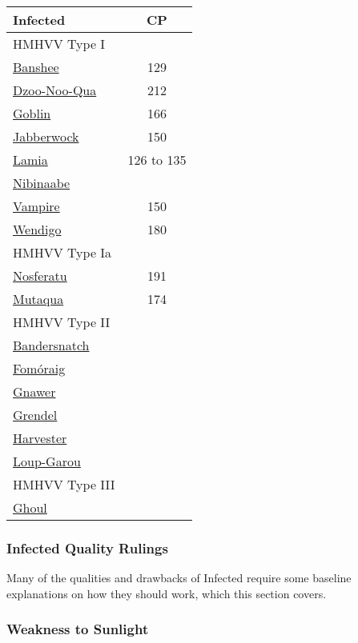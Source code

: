 \begin{multicols*}{3}
	
	\begin{center}
		\begin{tabularx}{0.32\textwidth}{|X|c|}
			\hline
			Infected & CP \\
			\hline
			\hline
			HMHVV Type I & \\
			\hline
			\hyperref[banshee]{Banshee} & 129 \\
			\hyperref[dzoo-noo-qua]{Dzoo-Noo-Qua} & 212 \\
			\hyperref[goblin]{Goblin} & 166 \\
			\hyperref[jabberwock]{Jabberwock} & 150 \\
			\hyperref[lamia]{Lamia} & 126 to 135 \\
			\hyperref[nibinaabe]{Nibinaabe} & \\
			\hyperref[vampire]{Vampire} & 150 \\
			\hyperref[wendigo]{Wendigo} & 180 \\
			\hline
			\hline
			HMHVV Type Ia & \\
			\hline
			\hyperref[nosferatu]{Nosferatu} & 191 \\
			\hyperref[mutaqua]{Mutaqua} & 174 \\
			\hline
			\hline
			HMHVV Type II & \\
			\hline
			\hyperref[bandersnatch]{Bandersnatch} & \\
			\hyperref[formoraig]{Fomóraig} & \\
			\hyperref[gnawer]{Gnawer} & \\
			\hyperref[grendel]{Grendel} & \\
			\hyperref[harvester]{Harvester} & \\
			\hyperref[loup-garou]{Loup-Garou} & \\
			\hline
			\hline
			HMHVV Type III & \\
			\hline
			\hyperref[ghoul]{Ghoul} & \\
			\hline
		\end{tabularx}
	\end{center}
	
	\subsubsection{Infected Quality Rulings}
	
	Many of the qualities and drawbacks of Infected require some baseline explanations on how they should work, which this section covers.
	
	\subsubsection*{Weakness to Sunlight}
	

\end{multicols*}
